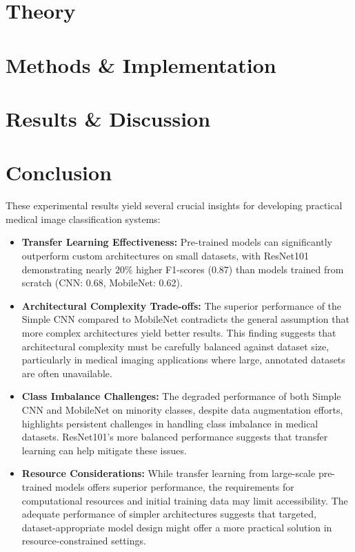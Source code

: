 \documentclass[aps,pra,english,notitlepage,reprint,nofootinbib]{revtex4-1}  %
\begin{document}
\section{Theory}\label{sec:theory}


\section{Methods \& Implementation}\label{sec:methods}


\clearpage

\section{Results \& Discussion}\label{sec:results discussion}


\section{Conclusion}\label{sec:conclusion}

These experimental results yield several crucial insights for developing practical medical image classification systems:

\begin{itemize}
    \item \textbf{Transfer Learning Effectiveness:} Pre-trained models can significantly outperform custom architectures on small datasets,  with ResNet101 demonstrating nearly $20\%$ higher F1-scores (0.87) than models trained from scratch (CNN: 0.68, MobileNet: 0.62).
    \item \textbf{Architectural Complexity Trade-offs:} The superior performance of the Simple CNN compared to MobileNet contradicts the general assumption that more complex architectures yield better results. This finding suggests that architectural complexity must be carefully balanced against dataset size, particularly in medical imaging applications where large, annotated datasets are often unavailable.
    \item \textbf{Class Imbalance Challenges:} The degraded performance of both Simple CNN and MobileNet on minority classes, despite data augmentation efforts, highlights persistent challenges in handling class imbalance in medical datasets. ResNet101's more balanced performance suggests that transfer learning can help mitigate these issues.
    \item \textbf{Resource Considerations:} While transfer learning from large-scale pre-trained models offers superior performance, the requirements for computational resources and initial training data may limit accessibility. The adequate performance of simpler architectures suggests that targeted, dataset-appropriate model design might offer a more practical solution in resource-constrained settings.
\end{itemize}
\end{document}
